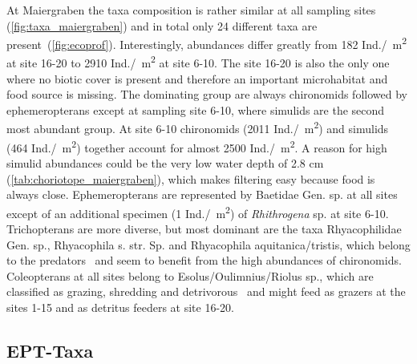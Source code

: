 At Maiergraben the taxa composition is rather similar at all sampling sites (\cref{fig:taxa_maiergraben}) and in total only 24 different taxa are present~(\cref{fig:ecoprof}). Interestingly, abundances differ greatly from 182 Ind./\SI{}{\square\meter} at site 16-20 to 2910 Ind./\SI{}{\square\meter} at site 6-10. The site 16-20 is also the only one where no biotic cover is present and therefore an important microhabitat and food source is missing. The dominating group are always chironomids followed by ephemeropterans except at sampling site 6-10, where simulids are the second most abundant group. At site 6-10 chironomids (2011 Ind./\SI{}{\square\meter}) and simulids (464 Ind./\SI{}{\square\meter}) together account for almost 2500 Ind./\SI{}{\square\meter}. A reason for high simulid abundances could be the very low water depth of 2.8 cm (\cref{tab:choriotope_maiergraben}), which makes filtering easy because food is always close. Ephemeropterans are represented by Baetidae Gen. sp. at all sites except of an additional specimen (1 Ind./\SI{}{\square\meter}) of \emph{Rhithrogena} sp. at site 6-10. Trichopterans are more diverse, but most dominant are the taxa Rhyacophilidae Gen. sp., Rhyacophila s. str. Sp. and Rhyacophila aquitanica/tristis, which belong to the predators~\parencite{Graf2002a} and seem to benefit from the high abundances of chironomids. Coleopterans at all sites belong to Esolus/Oulimnius/Riolus sp., which are classified as grazing, shredding and detrivorous~\parencite{Jach2002} and might feed as grazers at the sites 1-15 and as detritus feeders at site 16-20.




\subsection{EPT-Taxa}\label{sec:disc_ept_taxa}                      %

